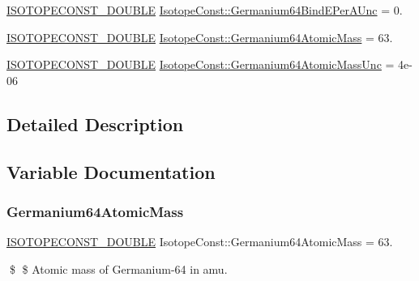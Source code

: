 \begin{DoxyCompactItemize}
\mbox{\hyperlink{group___isotope_const-_macros_ga8f45a7272ce02c0b4c65c44636ed719a}{I\+S\+O\+T\+O\+P\+E\+C\+O\+N\+S\+T\+\_\+\+D\+O\+U\+B\+LE}} \mbox{\hyperlink{group___isotope_const-_germanium-_ge64_gaa5d69cc47a7d52dfc39baa704f521a2f}{Isotope\+Const\+::\+Germanium64\+Bind\+E\+Per\+A\+Unc}} = 0.
\item 
\mbox{\hyperlink{group___isotope_const-_macros_ga8f45a7272ce02c0b4c65c44636ed719a}{I\+S\+O\+T\+O\+P\+E\+C\+O\+N\+S\+T\+\_\+\+D\+O\+U\+B\+LE}} \mbox{\hyperlink{group___isotope_const-_germanium-_ge64_ga4d3c5a2ccd3990e108051284174fc686}{Isotope\+Const\+::\+Germanium64\+Atomic\+Mass}} = 63.
\item 
\mbox{\hyperlink{group___isotope_const-_macros_ga8f45a7272ce02c0b4c65c44636ed719a}{I\+S\+O\+T\+O\+P\+E\+C\+O\+N\+S\+T\+\_\+\+D\+O\+U\+B\+LE}} \mbox{\hyperlink{group___isotope_const-_germanium-_ge64_ga61bfabbc2b9419d0b8f2d91a88747bd3}{Isotope\+Const\+::\+Germanium64\+Atomic\+Mass\+Unc}} = 4e-\/06
\end{DoxyCompactItemize}


\subsection{Detailed Description}


\subsection{Variable Documentation}
\mbox{\label{group___isotope_const-_germanium-_ge64_ga4d3c5a2ccd3990e108051284174fc686}} 
\subsubsection{\texorpdfstring{Germanium64\+Atomic\+Mass}{Germanium64AtomicMass}}
{\footnotesize\ttfamily \mbox{\hyperlink{group___isotope_const-_macros_ga8f45a7272ce02c0b4c65c44636ed719a}{I\+S\+O\+T\+O\+P\+E\+C\+O\+N\+S\+T\+\_\+\+D\+O\+U\+B\+LE}} Isotope\+Const\+::\+Germanium64\+Atomic\+Mass = 63.}

\$ \$ Atomic mass of Germanium-\/64 in amu. \mbox{\label{group___isotope_const-_germanium-_ge64_ga61bfabbc2b9419d0b8f2d91a88747bd3}} 

